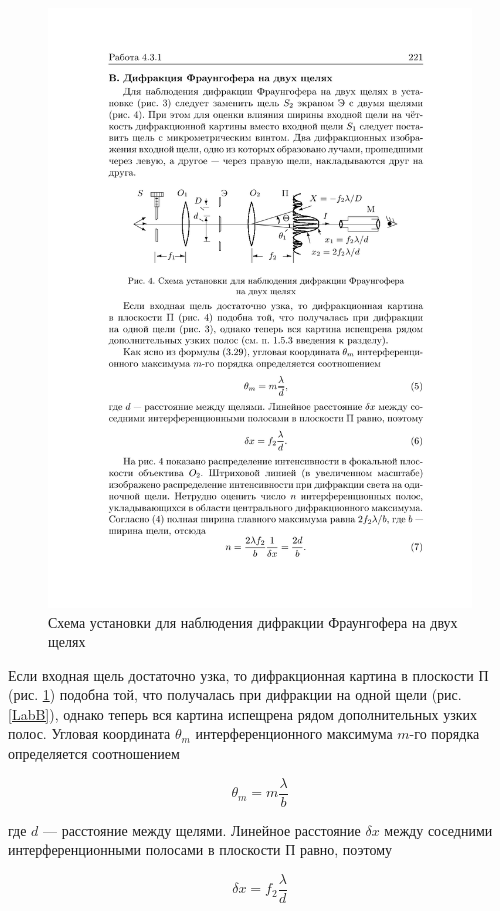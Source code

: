 \documentclass[a4paper, 12pt]{article}%
\begin{document}
\begin{figure}[h!]
	\centering
	\includegraphics[width=0.8\linewidth]{c.pdf}
	\caption{Схема установки для наблюдения дифракции Фраунгофера на двух щелях}
	\label{labC}
\end{figure}

Если входная щель достаточно узка, то дифракционная картина
в плоскости П (рис. \ref{labC}) подобна той, что получалась при дифракции
на одной щели (рис. \ref{LabB}), однако теперь вся картина испещрена рядом
дополнительных узких полос.
Угловая координата $ \theta_m $ интерференционного максимума $ m $-го порядка определяется соотношением

\begin{equation}\label{}
	\theta_m = m \dfrac{\lambda}{b}
\end{equation}

где $ d $ --- расстояние между щелями. Линейное расстояние $ \delta x $ между соседними интерференционными полосами в плоскости П равно, поэтому

\begin{equation}\label{dx}
	\delta x = f_2 \dfrac{\lambda}{d}
\end{equation}
\end{document}
